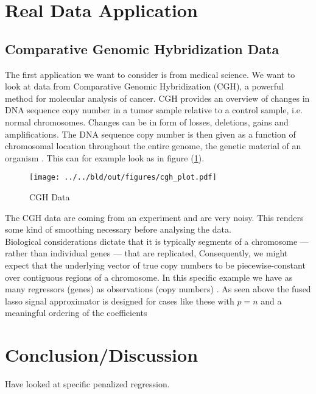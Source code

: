 \documentclass{article}
\theoremstyle{definition}
\begin{document}



\section{Real Data Application}

\subsection{Comparative Genomic Hybridization Data}
The first application we want to consider is from medical science. We want to look at data from Comparative Genomic Hybridization (CGH), a powerful method for molecular analysis of cancer.    
CGH provides an overview of changes in DNA sequence copy number in a tumor sample 
relative to a control sample, i.e. normal chromosomes. Changes can be in form of losses, deletions, gains and amplifications\citep{cghmain}. The DNA  sequence copy number is then given as a function of chromosomal location throughout the entire genome, the genetic material of an organism \citep{cghsecond}. This can for example look as in figure (\ref{cghdata}).

\begin{figure}
	\centering
	\texttt{[image: ../../bld/out/figures/cgh\_plot.pdf]}
	\caption{CGH Data}
	\label{cghdata}
\end{figure}

The CGH data are coming from an experiment and are very noisy. This renders some kind of smoothing necessary before analysing the data. \\
Biological considerations dictate that it is typically segments of a chromosome — rather than individual genes — that are replicated, Consequently, we might expect that the underlying vector of true copy numbers to be piecewise-constant over contiguous regions of a chromosome.
In this specific example we have as many regressors (genes) as observations (copy numbers) \citep{sparsity}.
As seen above the fused lasso signal approximator is designed for cases like these with $ p = n$ and a meaningful ordering of the coefficients

\section{Conclusion/Discussion}

Have looked at specific penalized regression.
\end{document}
